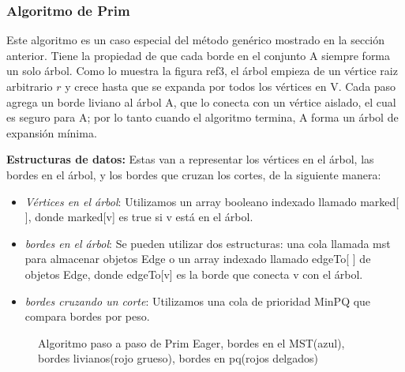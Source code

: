 \documentclass[a4paper, 11pt]{report}
\newcommand{\DrawEJcGraph}[5]{

    \begin{scope}[#5]
    \foreach \pos/\nodo in {{(0,0)/4}, {(0,1.2)/5}, {(1,1)/7}, {(2,2.2)/1}, {(2,0.6)/0}, {(3.4,0.9)/2}, {(3.4,2.2)/3}, {(5,0)/6}}
        \node[vertex] (#3\nodo) at \pos {\nodo};
    \foreach \start/\end in {4/5, 5/7, 7/1,7/0,0/2,2/3,2/6,4/7,1/5,0/4,1/2,1/3,2/7,3/6,6/0,6/4}
        \path[edge,#5] (#3\start) -- (#3\end);

    \foreach \nodo in {#1}
        \node[selected vertex] at (#3\nodo) {\nodo};

    \begin{pgfonlayer}{background}%
        \foreach \start/\end in {#2}
            \path[rojod edge,#5] (#3\start) -- (#3\end);
    \end{pgfonlayer}
    \begin{pgfonlayer}{background}%
        \foreach \start/\end in {#3}
            \path[rojog edge,#5] (#3\start) -- (#3\end);
    \end{pgfonlayer}
    \begin{pgfonlayer}{background}%
        \foreach \start/\end in {#4}
            \path[azul edge,#5] (#3\start) -- (#3\end);
    \end{pgfonlayer}
    \end{scope}

}
\newcommand{\DrawArrow}[1]{
    \begin{scope}[scale=0.5,#1]
        \filldraw[arrow] (0,0) -- (2,0) -- +(270:0.5) -- (3,0.5) -- (2,1.5) -- +(270:0.5) -- (0,1) -- cycle;
    \end{scope}
}
\begin{document}
\subsubsection{Algoritmo de Prim}

Este algoritmo es un caso especial del método genérico mostrado en la sección anterior. Tiene la propiedad de que cada borde en el conjunto A siempre forma un solo árbol. Como lo muestra la figura ref3, el árbol empieza de un vértice raiz arbitrario $r$ y crece hasta que se expanda por todos los vértices en V. Cada paso agrega un borde liviano al árbol A, que lo conecta con un vértice aislado, el cual es seguro para A; por lo tanto cuando el algoritmo termina, A forma un árbol de expansión mínima. 

\textbf{Estructuras de datos:} Estas van a representar los vértices en el árbol, las bordes en el árbol, y los bordes que cruzan los cortes, de la siguiente manera:
\begin{itemize}
\item \textit{Vértices en el árbol}: Utilizamos un array booleano indexado llamado marked[ ], donde marked[v] es true si v está en el árbol.
\item \textit{bordes en el árbol}: Se pueden utilizar dos estructuras: una cola llamada mst para almacenar objetos Edge o un array indexado llamado edgeTo[ ] de objetos Edge, donde edgeTo[v] es la borde que conecta v con el árbol.
\item \textit{bordes cruzando un corte}: Utilizamos una cola de prioridad MinPQ que compara bordes por peso.  
\end{itemize}

\begin{figure}[!h]
    \caption{Algoritmo paso a paso de Prim Eager, bordes en el MST(azul), bordes livianos(rojo grueso), bordes en pq(rojos delgados)}
    \label{MST4}
\end{figure}
\end{document}
